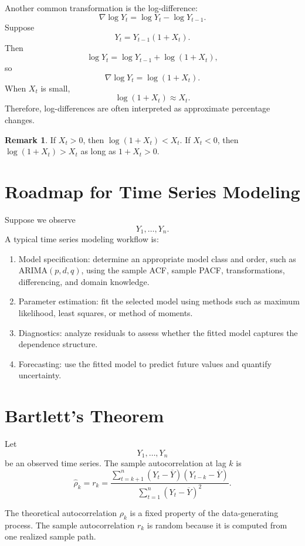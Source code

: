 \documentclass[12pt,oneside]{book}
\numberwithin{equation}{section}
\theoremstyle{definition}
\newtheorem{remark}{Remark}[section]
\theoremstyle{plain}
\theoremstyle{remark}
\begin{document}
Another common transformation is the log-difference:
\[
\nabla \log Y_t
=
\log Y_t-\log Y_{t-1}.
\]
Suppose
\[
Y_t=Y_{t-1}(1+X_t).
\]
Then
\[
\log Y_t
=
\log Y_{t-1}+\log(1+X_t),
\]
so
\[
\nabla \log Y_t
=
\log(1+X_t).
\]
When $X_t$ is small,
\[
\log(1+X_t)\approx X_t.
\]
Therefore, log-differences are often interpreted as approximate percentage changes.

\begin{remark}
If $X_t>0$, then $\log(1+X_t)<X_t$. If $X_t<0$, then $\log(1+X_t)>X_t$ as long as $1+X_t>0$.
\end{remark}

\section*{Roadmap for Time Series Modeling}

Suppose we observe
\[
Y_1,\ldots,Y_n.
\]
A typical time series modeling workflow is:

\begin{enumerate}
\item Model specification: determine an appropriate model class and order, such as ARIMA$(p,d,q)$, using the sample ACF, sample PACF, transformations, differencing, and domain knowledge.
\item Parameter estimation: fit the selected model using methods such as maximum likelihood, least squares, or method of moments.
\item Diagnostics: analyze residuals to assess whether the fitted model captures the dependence structure.
\item Forecasting: use the fitted model to predict future values and quantify uncertainty.
\end{enumerate}

\section{Bartlett's Theorem}

Let
\[
Y_1,\ldots,Y_n
\]
be an observed time series. The sample autocorrelation at lag $k$ is
\[
\widehat{\rho}_k
=
r_k
=
\frac{
\sum_{t=k+1}^n(Y_t-\overline{Y})(Y_{t-k}-\overline{Y})
}{
\sum_{t=1}^n(Y_t-\overline{Y})^2
}.
\]

The theoretical autocorrelation $\rho_k$ is a fixed property of the data-generating process. The sample autocorrelation $r_k$ is random because it is computed from one realized sample path.
\end{document}

